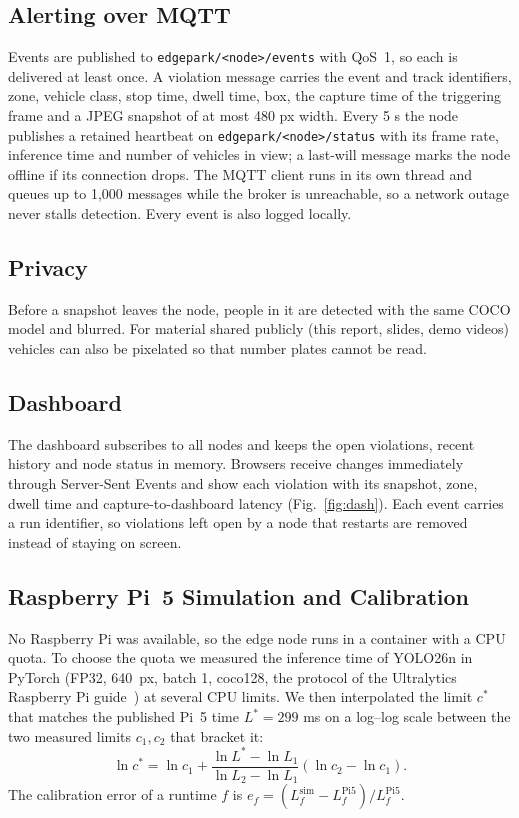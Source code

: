 \documentclass[conference]{IEEEtran}
\begin{document}
\subsection{Alerting over MQTT}
Events are published to \texttt{edgepark/<node>/events} with QoS~1, so each is delivered at least once. A violation message carries the event and track identifiers, zone, vehicle class, stop time, dwell time, box, the capture time of the triggering frame and a JPEG snapshot of at most 480 px width. Every 5 s the node publishes a retained heartbeat on \texttt{edgepark/<node>/status} with its frame rate, inference time and number of vehicles in view; a last-will message marks the node offline if its connection drops. The MQTT client runs in its own thread and queues up to 1,000 messages while the broker is unreachable, so a network outage never stalls detection. Every event is also logged locally.

\subsection{Privacy}
Before a snapshot leaves the node, people in it are detected with the same COCO model and blurred. For material shared publicly (this report, slides, demo videos) vehicles can also be pixelated so that number plates cannot be read.

\subsection{Dashboard}
The dashboard subscribes to all nodes and keeps the open violations, recent history and node status in memory. Browsers receive changes immediately through Server-Sent Events and show each violation with its snapshot, zone, dwell time and capture-to-dashboard latency (Fig.~\ref{fig:dash}). Each event carries a run identifier, so violations left open by a node that restarts are removed instead of staying on screen.

\subsection{Raspberry Pi~5 Simulation and Calibration}
No Raspberry Pi was available, so the edge node runs in a container with a CPU quota. To choose the quota we measured the inference time of YOLO26n in PyTorch (FP32, 640~px, batch 1, coco128, the protocol of the Ultralytics Raspberry Pi guide~\cite{ultralyticspi}) at several CPU limits. We then interpolated the limit $c^*$ that matches the published Pi~5 time $L^* = 299$ ms on a log--log scale between the two measured limits $c_1, c_2$ that bracket it:
\begin{equation}
\ln c^* = \ln c_1 + \frac{\ln L^* - \ln L_1}{\ln L_2 - \ln L_1}\left(\ln c_2 - \ln c_1\right).
\label{eq:cal}
\end{equation}
The calibration error of a runtime $f$ is $e_f = (L_f^{\text{sim}} - L_f^{\text{Pi5}}) / L_f^{\text{Pi5}}$.
\end{document}
